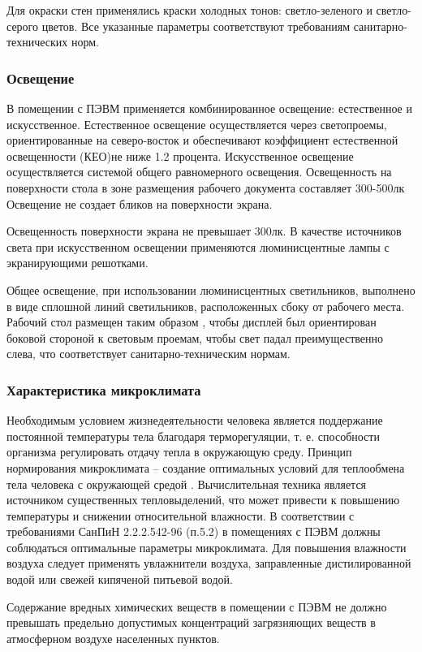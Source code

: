 Для окраски стен  применялись краски холодных тонов: светло-зеленого и светло-серого цветов.
Все указанные параметры соответствуют  требованиям  санитарно-технических норм.


\subsubsection{Освещение}
В помещении с ПЭВМ  применяется комбинированное освещение: естественное и искусственное.
Естественное освещение осуществляется через светопроемы, ориентированные на  северо-восток
и обеспечивают коэффициент естественной освещенности (КЕО)не ниже 1.2 процента.
Искусственное освещение  осуществляется системой общего равномерного освещения.
Освещенность на поверхности стола в зоне размещения рабочего документа составляет 300-500лк 
Освещение не  создает бликов на поверхности экрана.


Освещенность поверхности экрана не превышает 300лк.  В качестве источников света при искусственном
освещении применяются  люминисцентные лампы с экранирующими решотками.


Общее освещение, при использовании люминисцентных светильников, 
выполнено в виде сплошной линий светильников, расположенных сбоку от рабочего места.
Рабочий стол размещен таким образом , чтобы дисплей был ориентирован боковой стороной к
световым проемам, чтобы свет падал преимущественно слева, что соответствует санитарно-техническим
нормам.



\subsubsection{Характеристика микроклимата}
Необходимым условием жизнедеятельности человека является поддержание постоянной
температуры тела благодаря терморегуляции, т. е. способности 
организма регулировать отдачу тепла в окружающую среду. Принцип нормирования
микроклимата -- создание оптимальных условий для теплообмена тела человека с окружающей
средой \cite{bjd}. Вычислительная техника является источником существенных тепловыделений, что может
привести к  повышению температуры и снижении относительной влажности.
В соответствии с требованиями СанПиН 2.2.2.542-96  (п.5.2) в помещениях с ПЭВМ  должны
соблюдаться оптимальные параметры микроклимата. Для повышения влажности воздуха следует
применять увлажнители воздуха, заправленные дистилированной водой  или свежей кипяченой
питьевой водой.


Содержание вредных химических веществ в помещении с ПЭВМ не должно превышать предельно
допустимых концентраций загрязняющих веществ в атмосферном воздухе населенных пунктов.


